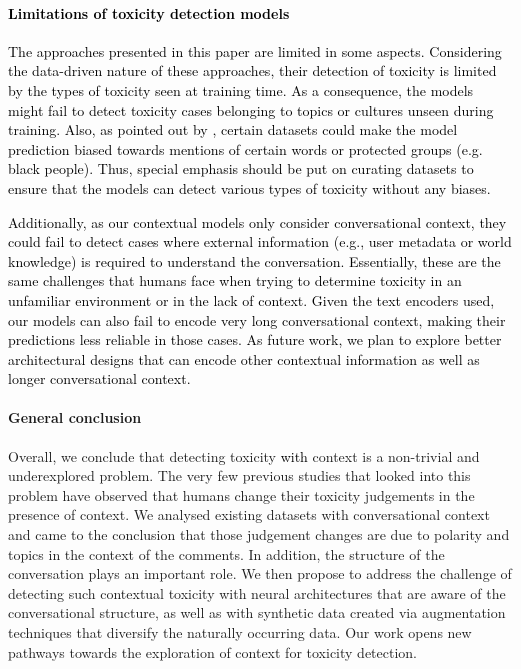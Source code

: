 \documentclass[acmsmall]{acmart}
\newcommand{\red}[1]{\textcolor{black}{#1}}
\begin{document}
\paragraph{\red{\bf Limitations of toxicity detection models}} \red{The approaches presented in this paper are limited in some aspects. Considering the data-driven nature of these approaches, their detection of toxicity is limited by the types of toxicity seen at training time. As a consequence, the models might fail to detect toxicity cases belonging to topics or cultures unseen during training. Also, as pointed out by \cite{unintended_bias}, certain datasets could make the model prediction biased towards mentions of certain words or protected groups (e.g. black people). Thus, special emphasis should be put on curating datasets to ensure that the models can detect various types of toxicity without any biases.}

\red{Additionally, as our contextual models only consider conversational context, they could fail to detect cases where external information (e.g., user metadata or world knowledge) is required to understand the conversation. Essentially, these are the same challenges that humans face when trying to determine toxicity in an unfamiliar environment or in the lack of context. Given the text encoders used, our models can also fail to encode very long conversational context, making their predictions less reliable in those cases. As future work, we plan to explore better architectural designs that can encode other contextual information as well as longer conversational context.
}

\paragraph{\bf General conclusion} Overall, we conclude that detecting toxicity \red{with} context is a non-trivial and underexplored problem. The very few previous studies that looked into this problem have observed that humans change their toxicity judgements in the presence of context. We analysed existing datasets with conversational context and  came to the conclusion that those judgement changes are due to polarity and topics in the context of the comments. In addition, the structure of the conversation plays an important role. We then propose to address the challenge of detecting such contextual toxicity with neural architectures that are aware of the conversational structure, as well as with synthetic data created via augmentation techniques that diversify the naturally occurring data. Our work opens new pathways towards the exploration of context for toxicity detection.
\end{document}
